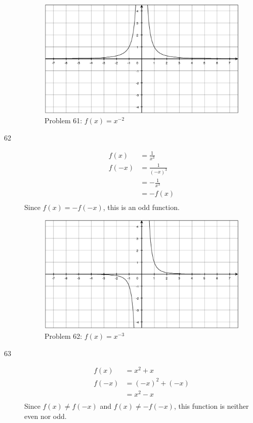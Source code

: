 \documentclass{exam}
\begin{document}
\begin{description}
      \begin{figure}[H]
        \centering
        \includegraphics[scale=.3]{problem_61.eps}
        \caption*{Problem 61:  $f(x) = x^{-2}$ }
      \end{figure}

    \item[62]
      \begin{align*}
        f(x)  &= \frac{1}{x^3} \\
        f(-x) &= \frac{1}{(-x)^3} \\ 
          &= - \frac{1}{x^3} \\ 
          &= -f(x) \\
      \end{align*}
      Since $f(x) = -f(-x)$, this is an odd function.

      \begin{figure}[H]
        \centering
        \includegraphics[scale=.3]{problem_62.eps}
        \caption*{Problem 62:  $f(x) = x^{-3}$ }
      \end{figure}

    \item[63]
      \begin{align*}
        f(x)  &= x^2 + x \\
        f(-x) &= (-x)^2 + (-x) \\
          &= x^2 - x \\
      \end{align*}
      Since $f(x) \neq f(-x)$ and $f(x) \neq -f(-x)$, this function is neither even nor odd.


\end{description}
\end{document}
